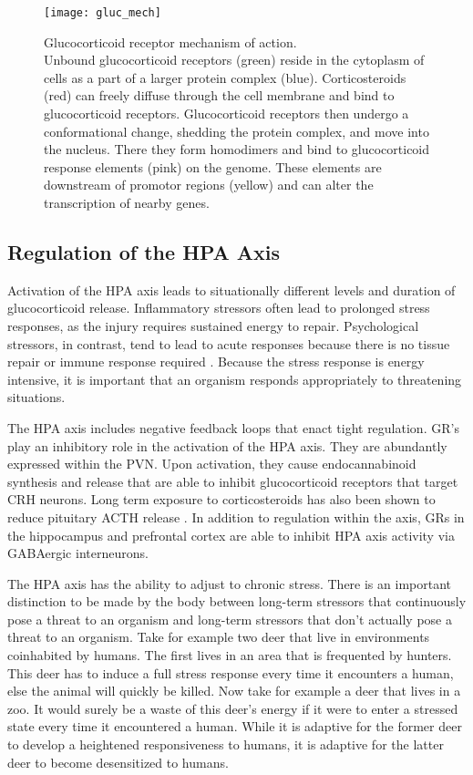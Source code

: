 \documentclass[12pt,twoside]{reedthesis}
\begin{document}
\begin{figure}[htbp] 
\begin{centering} 
\texttt{[image: gluc\_mech]}
\caption[Glucocorticoid receptor mechanism of action]{\footnotesize{Glucocorticoid receptor
    mechanism of action. \\ Unbound glucocorticoid receptors (green) reside in the
    cytoplasm of cells as a part of a larger protein complex (blue). Corticosteroids (red) can freely diffuse through the
    cell membrane and bind to glucocorticoid receptors. Glucocorticoid receptors
    then undergo a conformational change, shedding the protein complex, and
    move into the nucleus. There they form homodimers and bind to
    glucocorticoid response elements (pink) on the genome. These elements are
    downstream of promotor regions (yellow) and can alter the transcription of
    nearby genes.}}
\label{subd}
\end{centering} 
\end{figure}

\subsection{Regulation of the HPA Axis}
Activation of the HPA axis leads to situationally different levels and duration of
glucocorticoid release. Inflammatory stressors often lead to prolonged stress
responses, as the injury requires sustained energy to repair. Psychological
stressors, in contrast, tend to lead to acute responses because there is no
tissue repair or immune response required \citep{terjung_regulation_2016}. Because
the stress response is energy intensive, it is important that an organism
responds appropriately to threatening situations.

The HPA axis includes negative feedback loops that enact tight regulation.
GR's play an inhibitory role in the activation of the HPA axis. They are abundantly expressed
within the PVN. Upon activation, they cause endocannabinoid synthesis and
release that are able to inhibit glucocorticoid receptors that target CRH
neurons. Long term exposure to corticosteroids has also been shown to reduce
pituitary ACTH release \citep{terjung_hypothalamic-pituitary-adrenal_2015}. In addition to regulation within the
axis, GRs in the hippocampus and prefrontal cortex are able to
inhibit HPA axis activity via GABAergic interneurons. 

The HPA axis has the ability to adjust to chronic stress. There is an
important distinction to be made by the body between long-term stressors that continuously
pose a threat to an organism and long-term stressors that don't actually pose a
threat to an organism. Take for example two deer that live in environments
coinhabited by humans. The first lives in an area that is
frequented by hunters. This deer has to induce a full stress response
every time it encounters a human, else the animal will quickly be killed.
Now take for example a deer that lives in a zoo. It would surely be a waste of this deer's
energy if it were to enter a stressed state every time it encountered a human.
While it is adaptive for the former deer to develop a heightened responsiveness
to humans, it is adaptive for the latter deer to become desensitized to humans.
\end{document}
